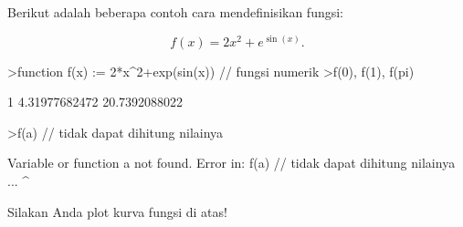 \documentclass[a4paper,11pt,oneside,enabledeprecatedfontcommands]{scrbook}
\newenvironment{eulernotebook}{}{}
\newenvironment{eulercomment}{\par\medskip\noindent}{\par\medskip}
\newenvironment{eulerformula}{}{}
\begin{document}
\begin{eulernotebook}
\begin{eulercomment}
Berikut adalah beberapa contoh cara mendefinisikan fungsi:
\end{eulercomment}
\begin{eulerformula}
\[
f(x)=2x^2+e^{\sin(x)}.
\]
\end{eulerformula}
\begin{eulerprompt}
>function f(x) := 2*x^2+exp(sin(x)) // fungsi numerik
>f(0), f(1), f(pi)
\end{eulerprompt}
\begin{euleroutput}
  1
  4.31977682472
  20.7392088022
\end{euleroutput}
\begin{eulerprompt}
>f(a) // tidak dapat dihitung nilainya
\end{eulerprompt}
\begin{euleroutput}
  Variable or function a not found.
  Error in:
  f(a) // tidak dapat dihitung nilainya ...
     ^
\end{euleroutput}
\begin{eulercomment}
Silakan Anda plot kurva fungsi di atas!


\end{eulercomment}
\end{eulernotebook}
\end{document}
